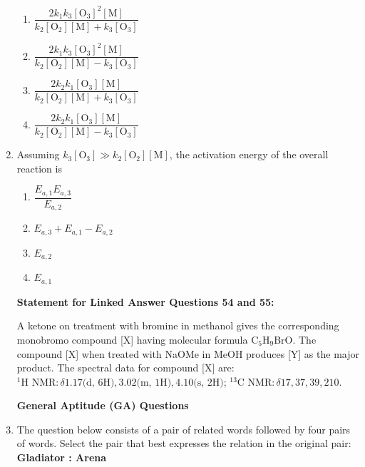 \documentclass[journal,12pt,onecolumn]{IEEEtran}
\theoremstyle{remark}
\begin{document}
\begin{enumerate}
\begin{multicols}{2}
\begin{enumerate}
    \item \( \dfrac{2k_1k_3[\text{O}_3]^2[\text{M}]}{k_2[\text{O}_2][\text{M}] + k_3[\text{O}_3]} \)
    \item \( \dfrac{2k_1k_3[\text{O}_3]^2[\text{M}]}{k_2[\text{O}_2][\text{M}] - k_3[\text{O}_3]} \)
    \item \( \dfrac{2k_2k_1[\text{O}_3][\text{M}]}{k_2[\text{O}_2][\text{M}] + k_3[\text{O}_3]} \)
    \item \( \dfrac{2k_2k_1[\text{O}_3][\text{M}]}{k_2[\text{O}_2][\text{M}] - k_3[\text{O}_3]} \)
\end{enumerate}
\end{multicols}

 

\item    \hspace{0.5cm} Assuming \(k_3[\text{O}_3] \gg k_2[\text{O}_2][\text{M}]\), the activation energy of the overall reaction is  \hfill{}

\begin{multicols}{2}
\begin{enumerate}
    \item \( \dfrac{E_{a,1}E_{a,3}}{E_{a,2}} \)
    \item \( E_{a,3} + E_{a,1} - E_{a,2} \)
    \item \( E_{a,2} \)
    \item \( E_{a,1} \)
\end{enumerate}
\end{multicols}

 

\noindent\textbf{Statement for Linked Answer Questions 54 and 55:}

A ketone on treatment with bromine in methanol gives the corresponding monobromo compound [X] having molecular formula C\(_5\)H\(_9\)BrO. The compound [X] when treated with NaOMe in MeOH produces [Y] as the major product. The spectral data for compound [X] are: \( ^1\text{H NMR}: \delta 1.17 \text{(d, 6H)}, 3.02 \text{(m, 1H)}, 4.10 \text{(s, 2H)} \); \(^{13}\text{C NMR}: \delta 17, 37, 39, 210 \).



\noindent\textbf{General Aptitude (GA) Questions}



 

\item    \hspace{0.5cm} The question below consists of a pair of related words followed by four pairs of words. Select the pair that best expresses the relation in the original pair:\\
\textbf{Gladiator : Arena}  \hfill{}


\end{enumerate}
\end{document}
